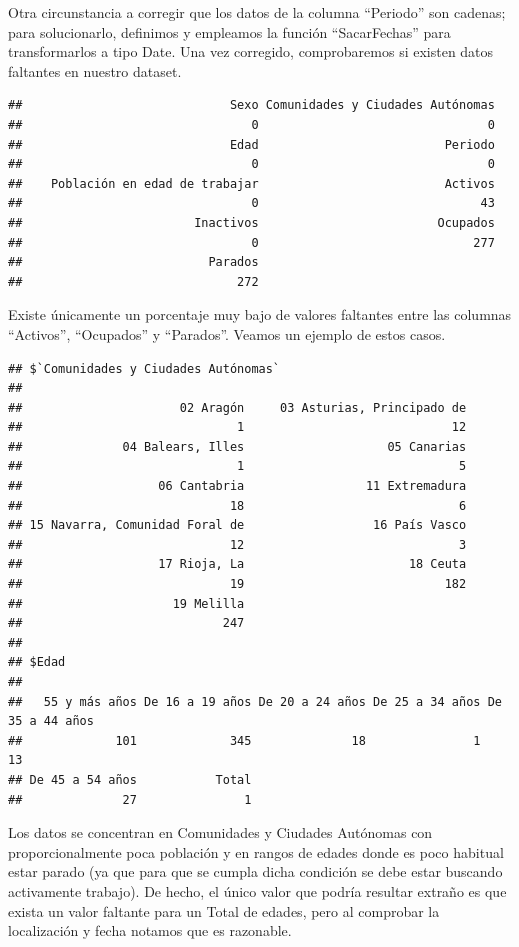 \documentclass[notspecified,article,submit,moreauthors,pdftex]{Definitions/mdpi}
\begin{document}
Otra circunstancia a corregir que los datos de la columna ``Periodo''
son cadenas; para solucionarlo, definimos y empleamos la función
``SacarFechas'' para transformarlos a tipo Date. Una vez corregido,
comprobaremos si existen datos faltantes en nuestro dataset.

\begin{verbatim}
##                             Sexo Comunidades y Ciudades Autónomas 
##                                0                                0 
##                             Edad                          Periodo 
##                                0                                0 
##    Población en edad de trabajar                          Activos 
##                                0                               43 
##                        Inactivos                         Ocupados 
##                                0                              277 
##                          Parados 
##                              272
\end{verbatim}

Existe únicamente un porcentaje muy bajo de valores faltantes entre las
columnas ``Activos'', ``Ocupados'' y ``Parados''. Veamos un ejemplo de
estos casos.

\begin{verbatim}
## $`Comunidades y Ciudades Autónomas`
## 
##                      02 Aragón     03 Asturias, Principado de 
##                              1                             12 
##              04 Balears, Illes                    05 Canarias 
##                              1                              5 
##                   06 Cantabria                 11 Extremadura 
##                             18                              6 
## 15 Navarra, Comunidad Foral de                  16 País Vasco 
##                             12                              3 
##                   17 Rioja, La                       18 Ceuta 
##                             19                            182 
##                     19 Melilla 
##                            247 
## 
## $Edad
## 
##   55 y más años De 16 a 19 años De 20 a 24 años De 25 a 34 años De 35 a 44 años 
##             101             345              18               1              13 
## De 45 a 54 años           Total 
##              27               1
\end{verbatim}

Los datos se concentran en Comunidades y Ciudades Autónomas con
proporcionalmente poca población y en rangos de edades donde es poco
habitual estar parado (ya que para que se cumpla dicha condición se debe
estar buscando activamente trabajo). De hecho, el único valor que podría
resultar extraño es que exista un valor faltante para un Total de
edades, pero al comprobar la localización y fecha notamos que es
razonable.
\end{document}
